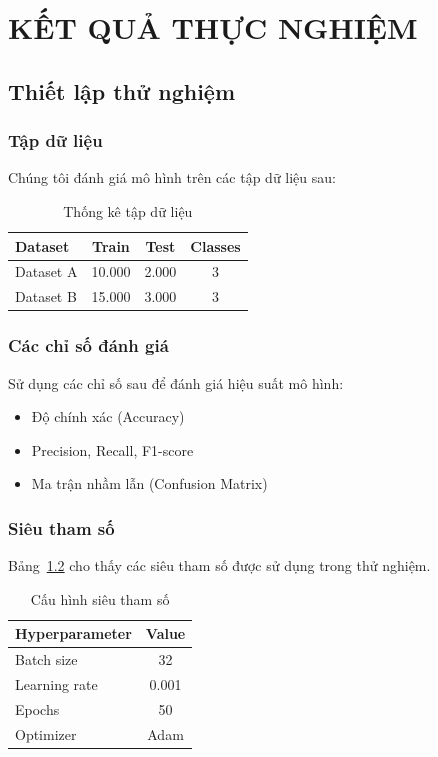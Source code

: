 \chapter{KẾT QUẢ THỰC NGHIỆM}
\label{chap:experiments}

\section{Thiết lập thử nghiệm}

\subsection{Tập dữ liệu}

Chúng tôi đánh giá mô hình trên các tập dữ liệu sau:

\begin{table}[H]
\centering
\caption{Thống kê tập dữ liệu}
\label{tab:datasets}
\begin{tabular}{lccc}
\toprule
Dataset & Train & Test & Classes \\
\midrule
Dataset A & 10.000 & 2.000 & 3 \\
Dataset B & 15.000 & 3.000 & 3 \\
\bottomrule
\end{tabular}
\end{table}

\subsection{Các chỉ số đánh giá}

Sử dụng các chỉ số sau để đánh giá hiệu suất mô hình:
\begin{itemize}
    \item Độ chính xác (Accuracy)
    \item Precision, Recall, F1-score
    \item Ma trận nhầm lẫn (Confusion Matrix)
\end{itemize}

\subsection{Siêu tham số}

Bảng~\ref{tab:hyperparams} cho thấy các siêu tham số được sử dụng trong thử nghiệm.

\begin{table}[H]
\centering
\caption{Cấu hình siêu tham số}
\label{tab:hyperparams}
\begin{tabular}{lc}
\toprule
Hyperparameter & Value \\
\midrule
Batch size & 32 \\
Learning rate & 0.001 \\
Epochs & 50 \\
Optimizer & Adam \\
\bottomrule
\end{tabular}
\end{table}

